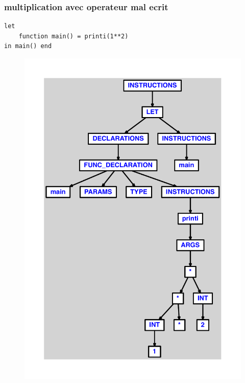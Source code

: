 \documentclass{article}
\begin{document}
\subsubsection{multiplication avec operateur mal ecrit}
\begin{lstlisting}
let
	function main() = printi(1**2)
in main() end
\end{lstlisting}
\newpage
\begin{figure}[H]
\centering
\includegraphics[max width=\textwidth]{ast/ast_24.pdf}
\end{figure}
\newpage
\end{document}

